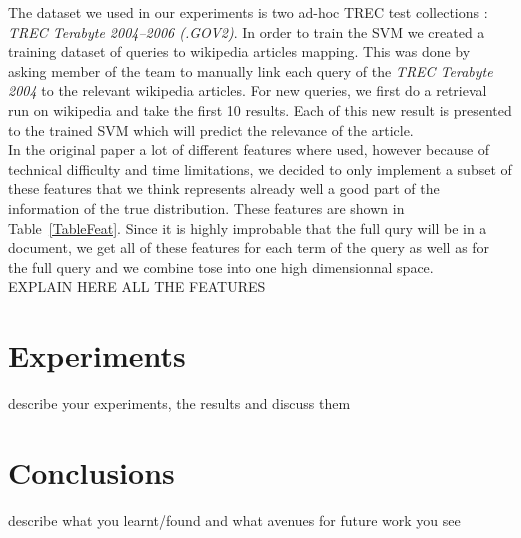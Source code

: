 \documentclass[sigconf]{acmart}
\begin{document}
The dataset we used in our experiments is two ad-hoc TREC test collections : \textit{TREC Terabyte 2004–2006 (.GOV2)}. In order to train the SVM we created a training dataset of queries to wikipedia articles mapping. This was done by asking member of the team to manually link each query of the \textit{TREC Terabyte 2004} to the relevant wikipedia articles. For new queries, we first do a retrieval run on wikipedia and take the first 10 results. Each of this new result is presented to the trained SVM which will predict the relevance of the article.\\

In the original paper a lot of different features where used, however because of technical difficulty and time limitations, we decided to only implement a subset of these features that we think represents already well a good part of the information of the true distribution. These features are shown in Table~\ref{TableFeat}. Since it is highly improbable that the full qury will be in a document, we get all of these features for each term of the query as well as for the full query and we combine tose into one high dimensionnal space.\\

EXPLAIN HERE ALL THE FEATURES





\section{Experiments}
describe your experiments, the results and discuss them


\section{Conclusions}
describe what you learnt/found and what avenues for future work you see


\balance

 
\end{document}
